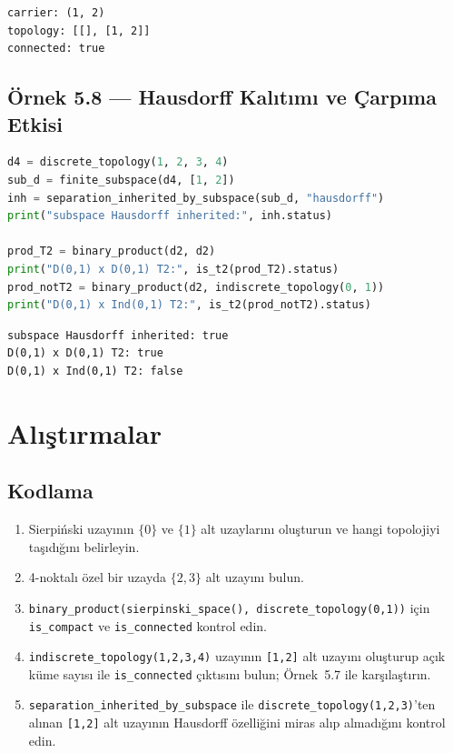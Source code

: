 \begin{verbatim}
carrier: (1, 2)
topology: [[], [1, 2]]
connected: true
\end{verbatim}

\subsection*{Örnek 5.8 — Hausdorff Kalıtımı ve Çarpıma Etkisi}

\begin{lstlisting}[language=Python]
d4 = discrete_topology(1, 2, 3, 4)
sub_d = finite_subspace(d4, [1, 2])
inh = separation_inherited_by_subspace(sub_d, "hausdorff")
print("subspace Hausdorff inherited:", inh.status)

prod_T2 = binary_product(d2, d2)
print("D(0,1) x D(0,1) T2:", is_t2(prod_T2).status)
prod_notT2 = binary_product(d2, indiscrete_topology(0, 1))
print("D(0,1) x Ind(0,1) T2:", is_t2(prod_notT2).status)
\end{lstlisting}

\begin{verbatim}
subspace Hausdorff inherited: true
D(0,1) x D(0,1) T2: true
D(0,1) x Ind(0,1) T2: false
\end{verbatim}

\section{Alıştırmalar}

\subsection*{Kodlama}

\begin{enumerate}[label=K\arabic*.]
\item Sierpiński uzayının $\{0\}$ ve $\{1\}$ alt uzaylarını oluşturun ve
      hangi topolojiyi taşıdığını belirleyin.
\item 4-noktalı özel bir uzayda $\{2,3\}$ alt uzayını bulun.
\item \texttt{binary\_product(sierpinski\_space(), discrete\_topology(0,1))}
      için \texttt{is\_compact} ve \texttt{is\_connected} kontrol edin.
\item \texttt{indiscrete\_topology(1,2,3,4)} uzayının \texttt{[1,2]} alt uzayını
      oluşturup açık küme sayısı ile \texttt{is\_connected} çıktısını bulun;
      Örnek~5.7 ile karşılaştırın.
\item \texttt{separation\_inherited\_by\_subspace} ile
      \texttt{discrete\_topology(1,2,3)}'ten alınan \texttt{[1,2]} alt uzayının
      Hausdorff özelliğini miras alıp almadığını kontrol edin.
\end{enumerate}

